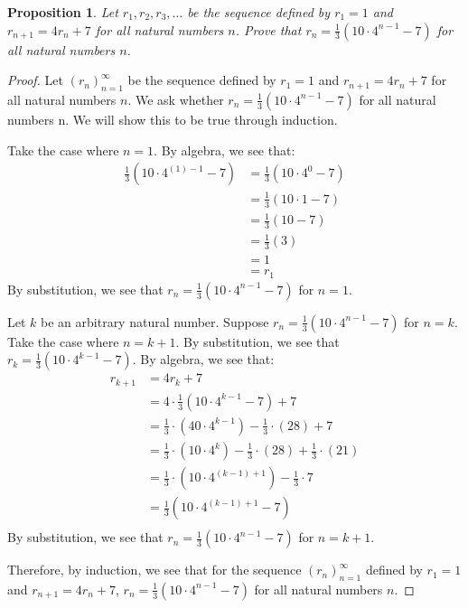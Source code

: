 \documentclass{amsart}
\newtheorem*{proposition}{Proposition}
\numberwithin{equation}{section}
\begin{document}
	\begin{problem}[manual-num=63]
		\begin{proposition}
			Let $r_1, r_2, r_3, \dots$ be the sequence defined by $r_1 = 1$ and $r_{n + 1} = 4r_n + 7$ for all natural numbers $n$.
			Prove that $r_n = \frac{1}{3} (10 \cdot 4^{n-1} - 7)$ for all natural numbers $n$.
		\end{proposition}

		\begin{proof}
			Let $(r_n)_{n=1}^{\infty}$ be the sequence defined by $r_1 = 1$ and $r_{n + 1} = 4r_n + 7$ for all natural numbers $n$.
			We ask whether $r_n = \frac{1}{3} (10 \cdot 4^{n-1} - 7)$ for all natural numbers n.
			We will show this to be true through induction.

			Take the case where $n = 1$.
			By algebra, we see that:
			\begin{align*}
				\frac{1}{3} (10 \cdot 4^{(1)-1} - 7) &= \frac{1}{3} (10 \cdot 4^0 - 7) \\
				&= \frac{1}{3} (10 \cdot 1 - 7) \\
				&= \frac{1}{3} (10 - 7) \\
				&= \frac{1}{3} (3) \\
				&= 1 \\
				&= r_1
			\end{align*}
			By substitution, we see that $r_n = \frac{1}{3} (10 \cdot 4^{n-1} - 7)$ for $n = 1$.

			Let $k$ be an arbitrary natural number.
			Suppose $r_n = \frac{1}{3} (10 \cdot 4^{n-1} - 7)$ for $n = k$.
			Take the case where $n = k + 1$.
			By substitution, we see that $r_k = \frac{1}{3} (10 \cdot 4^{k-1} - 7)$.
			By algebra, we see that:
			\begin{align*}
				r_{k + 1} &= 4r_k + 7 \\
				&= 4 \cdot \frac{1}{3} (10 \cdot 4^{k-1} - 7) + 7 \\
				&= \frac{1}{3} \cdot (40 \cdot 4^{k - 1}) - \frac{1}{3} \cdot (28) + 7\\
				&= \frac{1}{3} \cdot (10 \cdot 4^k) - \frac{1}{3} \cdot (28) + \frac{1}{3} \cdot (21) \\
				&= \frac{1}{3} \cdot (10 \cdot 4^{(k - 1) + 1}) - \frac{1}{3} \cdot 7 \\
				&= \frac{1}{3} (10 \cdot 4^{(k - 1) + 1} - 7) \\
			\end{align*}
			By substitution, we see that $r_n = \frac{1}{3} (10 \cdot 4^{n-1} - 7)$ for $n = k + 1$.

			Therefore, by induction, we see that for the sequence  $(r_n)_{n=1}^{\infty}$ defined by $r_1 = 1$ and $r_{n + 1} = 4r_n + 7$, $r_n = \frac{1}{3} (10 \cdot 4^{n-1} - 7)$ for all natural numbers $n$.

		\end{proof}
	\end{problem}
\end{document}
